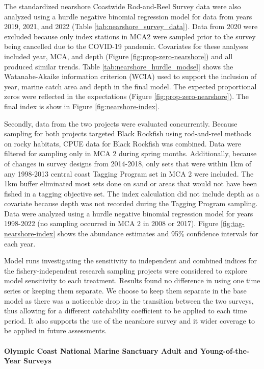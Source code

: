 \documentclass[11pt,
  english,
  letterpaper,
]{article}
\begin{document}
The standardized nearshore Coastwide Rod-and-Reel Survey data were also analyzed using a hurdle negative binomial regression model for data from years 2019, 2021, and 2022 (Table \ref{tab:nearshore_survey_data}). Data from 2020 were excluded because only index stations in MCA2 were sampled prior to the survey being cancelled due to the COVID-19 pandemic. Covariates for these analyses included year, MCA, and depth (Figure \ref{fig:prop-zero-nearshore}) and all produced similar trends. Table \ref{tab:nearshore_hurdle_modsel} shows the Watanabe-Akaike information criterion (WCIA) used to support the inclusion of year, marine catch area and depth in the final model. The expected proportional zeros were reflected in the expectations (Figure \ref{fig:prop-zero-nearshore}). The final index is show in Figure \ref{fig:nearshore-index}.

Secondly, data from the two projects were evaluated concurrently. Because sampling for both projects targeted Black Rockfish using rod-and-reel methods on rocky habitats, CPUE data for Black Rockfish was combined. Data were filtered for sampling only in MCA 2 during spring months. Additionally, because of changes in survey designs from 2014-2018, only sets that were within 1km of any 1998-2013 central coast Tagging Program set in MCA 2 were included. The 1km buffer eliminated most sets done on sand or areas that would not have been fished in a tagging objective set. The index calculation did not include depth as a covariate because depth was not recorded during the Tagging Program sampling. Data were analyzed using a hurdle negative binomial regression model for years 1998-2022 (no sampling occurred in MCA 2 in 2008 or 2017). Figure \ref{fig:tag-nearshore-index} shows the abundance estimates and 95\% confidence intervals for each year.

Model runs investigating the sensitivity to independent and combined indices for the fishery-independent research sampling projects were considered to explore model sensitivity to each treatment. Results found no difference in using one time series or keeping them separate. We choose to keep them separate in the base model as there was a noticeable drop in the transition between the two surveys, thus allowing for a different catchability coefficient to be applied to each time period. It also supports the use of the nearshore survey and it wider coverage to be applied in future assessments.

\hypertarget{olympic-coast-national-marine-sanctuary-adult-and-young-of-the-year-surveys}{%
\paragraph{Olympic Coast National Marine Sanctuary Adult and Young-of-the-Year Surveys}\label{olympic-coast-national-marine-sanctuary-adult-and-young-of-the-year-surveys}}
\end{document}

